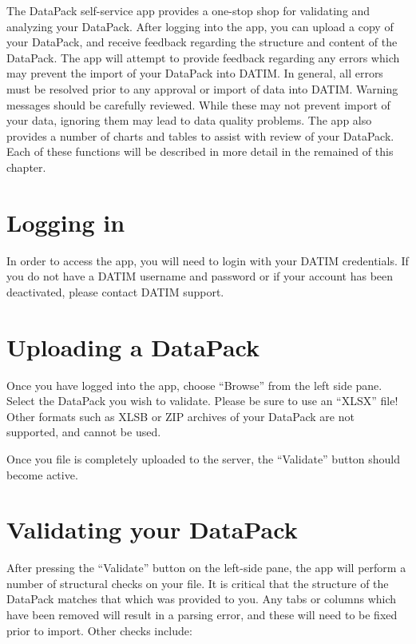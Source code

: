 \documentclass[
  openany]{book}
\begin{document}
The DataPack self-service app provides a one-stop shop for validating
and analyzing your DataPack. After logging into the app, you can upload
a copy of your DataPack, and receive feedback regarding the structure
and content of the DataPack. The app will attempt to provide feedback
regarding any errors which may prevent the import of your DataPack into
DATIM. In general, all errors must be resolved prior to any approval or
import of data into DATIM. Warning messages should be carefully
reviewed. While these may not prevent import of your data, ignoring them
may lead to data quality problems. The app also provides a number of
charts and tables to assist with review of your DataPack. Each of these
functions will be described in more detail in the remained of this
chapter.

\hypertarget{logging-in}{%
\section{Logging in}\label{logging-in}}

In order to access the app, you will need to login with your DATIM
credentials. If you do not have a DATIM username and password or if your
account has been deactivated, please contact DATIM support.

\hypertarget{uploading-a-datapack}{%
\section{Uploading a DataPack}\label{uploading-a-datapack}}

Once you have logged into the app, choose ``Browse'' from the left side
pane. Select the DataPack you wish to validate. Please be sure to use an
``XLSX'' file! Other formats such as XLSB or ZIP archives of your DataPack
are not supported, and cannot be used.

Once you file is completely uploaded to the server, the ``Validate''
button should become active.

\hypertarget{validating-your-datapack}{%
\section{Validating your DataPack}\label{validating-your-datapack}}

After pressing the ``Validate'' button on the left-side pane, the app will
perform a number of structural checks on your file. It is critical that
the structure of the DataPack matches that which was provided to you.
Any tabs or columns which have been removed will result in a parsing
error, and these will need to be fixed prior to import. Other checks
include:
\end{document}
